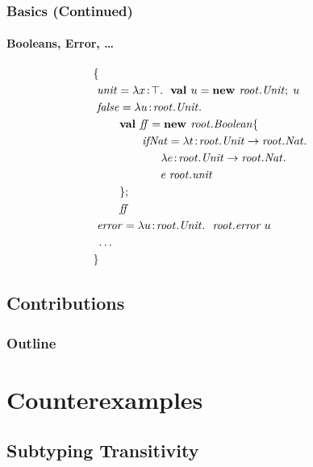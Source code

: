 \documentclass{beamer}
\begin{document}
\begin{frame}
\frametitle{Basics (Continued)}
\framesubtitle{Booleans, Error, \ldots}
\begin{align*}
&\mlldefs{\\
&\ \mi{unit}  = \abs x \Top {\new u {\mi{root}.\mi{Unit}} u}\\
&\ \mi{false} = \abs u {\mi{root}.\mi{Unit}} {\\
&\ \gap \mlnew {\mi{ff}} {\mi{root}.\mi{Boolean} \mlldefs{\\
&\ \gap\gap {\mi{ifNat}} = \abs t {\mi{root}.\mi{Unit} \tfun \mi{root}.\mi{Nat}} {\\&\gap\gap\gap\abs e {\mi{root}.\mi{Unit} \tfun \mi{root}.\mi{Nat}}\\&\gap\gap\gap\app e {\mi{root}.\mi{unit}}}\\
&\ \gap}}{
\ \gap \mi{ff}}
&}\\
&\ \mi{error} = \abs u {\mi{root}.\mi{Unit}} {\app {\mi{root}.\mi{error}} u}\\
&\ \ldots\\
&}
\end{align*}
\end{frame}

\subsection{Contributions}
\begin{frame}
\frametitle{Outline}
\tableofcontents
\end{frame}

\section{Counterexamples}
\frame{\tableofcontents[currentsection]}

\subsection{Subtyping Transitivity}
\end{document}
